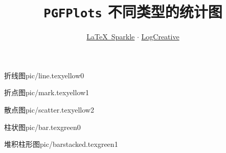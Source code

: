 \documentclass[a4paper,12pt]{article}
\title{\texttt{PGFPlots} 不同类型的统计图}
\author{\href{https://logcreative.github.io/LaTeXSparkle/index.html}{\LaTeX\ Sparkle} $\cdot$ \href{https://space.bilibili.com/31271993}{LogCreative}}
\date{}
\begin{document}
\begin{CJK}{UTF8}{song} %
    \maketitle

    \begin{graphbox}{折线图}{pic/line.tex}{yellow}{0}
    \end{graphbox}
    
    \begin{graphbox}{折点图}{pic/mark.tex}{yellow}{1}
    \end{graphbox}

    \begin{graphbox}{散点图}{pic/scatter.tex}{yellow}{2}
    \end{graphbox}

    \begin{graphbox}{柱状图}{pic/bar.tex}{green}{0}
    \end{graphbox}

    \begin{graphbox}{堆积柱形图}{pic/barstacked.tex}{green}{1}
    \end{graphbox}

\end{CJK}
\end{document}
